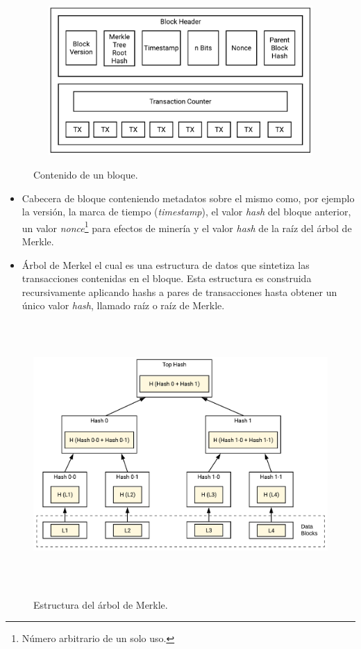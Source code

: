 \documentclass[12pt,a4paper, twoside]{report}
\begin{document}
	 \begin{figure}[!ht]   
		\caption{Contenido de un bloque.} 
		\begin{center} 
			\includegraphics[width=12cm,height=5.7cm]{Images/stateArt/block} \\
			\label{fig:stateArt_block} 
		\end{center}  
	\end{figure}
	
	 \begin{itemize}
	 	\item Cabecera de bloque conteniendo metadatos sobre el mismo como, por ejemplo la versión, la marca de tiempo (\textit{timestamp}), el valor \textit{hash} del bloque anterior, un valor \textit{nonce}\footnote{Número arbitrario de un solo uso.} para efectos de minería y el valor \textit{hash} de la raíz del árbol de Merkle.
	 	\item Árbol de Merkel el cual es una estructura de datos que sintetiza las transacciones contenidas en el bloque. Esta estructura es construida recursivamente aplicando \glspl{hash} a pares de transacciones hasta obtener un único valor \textit{hash}, llamado raíz o raíz de Merkle.
	 \end{itemize}
	 
	 \begin{figure}[!ht]   
		\caption{Estructura del árbol de Merkle.} 
		\begin{center} 
			\includegraphics[width=15cm,height=10cm]{Images/stateArt/merkle} \\
			\label{fig:stateArt_merkle} 
		\end{center}  
	\end{figure}
\end{document}
